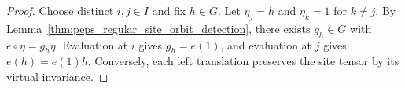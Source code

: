 \begin{proof}\leanok
    Choose distinct $i,j\in I$ and fix $h\in G$. Let $\eta_j=h$
    and $\eta_k=1$ for $k\ne j$. By
    Lemma~\ref{thm:peps_regular_site_orbit_detection}, there exists
    $g_h\in G$ with $e\circ\eta=g_h\eta$. Evaluation at $i$ gives
    $g_h=e(1)$, and evaluation at $j$ gives $e(h)=e(1)h$.
    Conversely, each left translation preserves the site tensor by
    its virtual invariance.
\end{proof}
